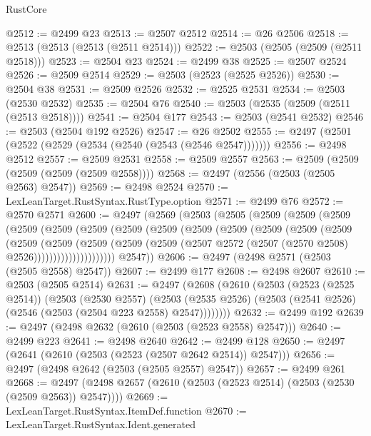 \begin{lexlean}{RustCore}
\begin{coremodule}
@2512 := @2499 @23
@2513 := @2507 @2512
@2514 := @26 @2506
@2518 := @2513 (@2513 (@2513 (@2511 @2514)))
@2522 := @2503 (@2505 (@2509 (@2511 @2518)))
@2523 := @2504 @23
@2524 := @2499 @38
@2525 := @2507 @2524
@2526 := @2509 @2514
@2529 := @2503 (@2523 (@2525 @2526))
@2530 := @2504 @38
@2531 := @2509 @2526
@2532 := @2525 @2531
@2534 := @2503 (@2530 @2532)
@2535 := @2504 @76
@2540 := @2503 (@2535 (@2509 (@2511 (@2513 @2518))))
@2541 := @2504 @177
@2543 := @2503 (@2541 @2532)
@2546 := @2503 (@2504 @192 @2526)
@2547 := @26 @2502
@2555 := @2497 (@2501 (@2522 (@2529 (@2534 (@2540 (@2543 (@2546 @2547)))))))
@2556 := @2498 @2512
@2557 := @2509 @2531
@2558 := @2509 @2557
@2563 := @2509 (@2509 (@2509 (@2509 (@2509 @2558))))
@2568 := @2497 (@2556 (@2503 (@2505 @2563) @2547))
@2569 := @2498 @2524
@2570 := LexLeanTarget.RustSyntax.RustType.option
@2571 := @2499 @76
@2572 := @2570 @2571
@2600 := @2497
    (@2569
      (@2503
        (@2505
          (@2509
            (@2509
              (@2509
                (@2509
                  (@2509
                    (@2509
                      (@2509
                        (@2509
                          (@2509
                            (@2509
                              (@2509
                                (@2509
                                  (@2509
                                    (@2509
                                      (@2509
                                        (@2509
                                          (@2509
                                            (@2509
                                              (@2507
                                                @2572
                                                (@2507 (@2570 @2508) @2526)))))))))))))))))))))
        @2547))
@2606 := @2497 (@2498 @2571 (@2503 (@2505 @2558) @2547))
@2607 := @2499 @177
@2608 := @2498 @2607
@2610 := @2503 (@2505 @2514)
@2631 := @2497
    (@2608
      (@2610
        (@2503
          (@2523 (@2525 @2514))
          (@2503
            (@2530 @2557)
            (@2503 (@2535 @2526) (@2503 (@2541 @2526) (@2546 (@2503 (@2504 @223 @2558) @2547))))))))
@2632 := @2499 @192
@2639 := @2497 (@2498 @2632 (@2610 (@2503 (@2523 @2558) @2547)))
@2640 := @2499 @223
@2641 := @2498 @2640
@2642 := @2499 @128
@2650 := @2497 (@2641 (@2610 (@2503 (@2523 (@2507 @2642 @2514)) @2547)))
@2656 := @2497 (@2498 @2642 (@2503 (@2505 @2557) @2547))
@2657 := @2499 @261
@2668 := @2497 (@2498 @2657 (@2610 (@2503 (@2523 @2514) (@2503 (@2530 (@2509 @2563)) @2547))))
@2669 := LexLeanTarget.RustSyntax.ItemDef.function
@2670 := LexLeanTarget.RustSyntax.Ident.generated

\end{coremodule}
\end{lexlean}
